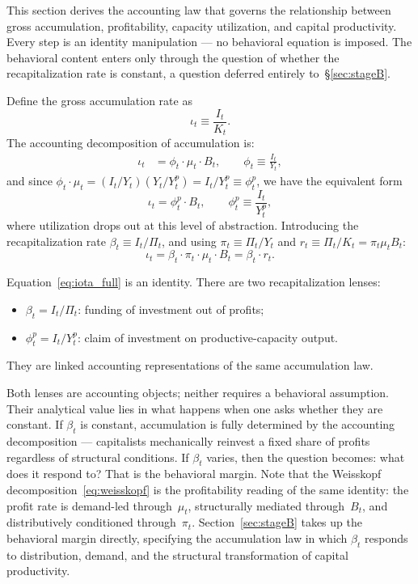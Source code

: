 \documentclass[12pt,letterpaper]{article}
\newcommand{\mut}{\mu_t}           %
\newcommand{\Yp}{Y^p_t}            %
\newcommand{\pit}{\pi_t}           %
\newcommand{\iotat}{\iota_t}       %
\newcommand{\betat}{\beta_t}       %
\newcommand{\Bt}{B_t}              %
\newcommand{\phit}{\phi_t}         %
\begin{document}
This section derives the accounting law that governs the relationship between
gross accumulation, profitability, capacity utilization, and capital
productivity. Every step is an identity manipulation --- no behavioral equation
is imposed. The behavioral content enters only through the question of whether
the recapitalization rate is constant, a question deferred entirely
to~\S\ref{sec:stageB}.

Define the gross accumulation rate as
\begin{equation}
  \iotat \equiv \frac{I_t}{K_t}.
  \label{eq:iota}
\end{equation}
The accounting decomposition of accumulation is:
\begin{align}
  \iotat &= \phit \cdot \mut \cdot \Bt,
  \qquad \phit \equiv \frac{I_t}{Y_t},
  \label{eq:iota_decomp}
\end{align}
and since $\phit \cdot \mut = (I_t/Y_t)(Y_t/\Yp) = I_t/\Yp \equiv \phi^p_t$,
we have the equivalent form
\begin{equation}
  \iotat = \phi^p_t \cdot \Bt,
  \qquad
  \phi^p_t \equiv \frac{I_t}{\Yp},
  \label{eq:iota_phip}
\end{equation}
where utilization drops out at this level of abstraction.
Introducing the recapitalization rate $\betat \equiv I_t/\Pi_t$,
and using $\pit \equiv \Pi_t/Y_t$ and $r_t \equiv \Pi_t/K_t = \pit\mut\Bt$:
\begin{equation}
  \boxed{\iotat = \betat \cdot \pit \cdot \mut \cdot \Bt = \betat \cdot r_t.}
  \label{eq:iota_full}
\end{equation}

Equation~\eqref{eq:iota_full} is an identity. There are two recapitalization lenses:
\begin{itemize}
  \item $\betat = I_t/\Pi_t$: funding of investment out of profits;
  \item $\phi^p_t = I_t/\Yp$: claim of investment on productive-capacity output.
\end{itemize}
They are linked accounting representations of the same accumulation law.

Both lenses are accounting objects; neither requires a behavioral assumption.
Their analytical value lies in what happens when one asks whether they are
constant. If $\betat$ is constant, accumulation is fully determined by the
accounting decomposition --- capitalists mechanically reinvest a fixed share of
profits regardless of structural conditions. If $\betat$ varies, then the
question becomes: what does it respond to? That is the behavioral margin. Note
that the Weisskopf decomposition~\eqref{eq:weisskopf} is the profitability
reading of the same identity: the profit rate is demand-led through~$\mut$,
structurally mediated through~$\Bt$, and distributively conditioned
through~$\pit$. Section~\ref{sec:stageB} takes up the behavioral margin
directly, specifying the accumulation law in which $\betat$ responds to
distribution, demand, and the structural transformation of capital
productivity.
\end{document}
